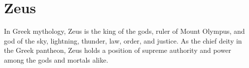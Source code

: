 \section{Zeus}
In Greek mythology, Zeus is the king of the gods, ruler of Mount Olympus, and god of the sky, lightning, thunder, law, order, and justice. As the chief deity in the Greek pantheon, Zeus holds a position of supreme authority and power among the gods and mortals alike.
